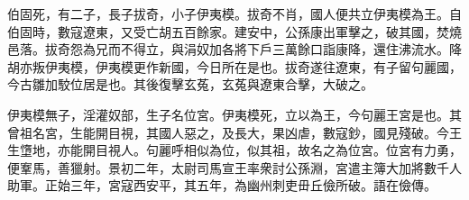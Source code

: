 \begin{pinyinscope}
伯固死，有二子，長子拔奇，小子伊夷模。拔奇不肖，國人便共立伊夷模為王。自伯固時，數寇遼東，又受亡胡五百餘家。建安中，公孫康出軍擊之，破其國，焚燒邑落。拔奇怨為兄而不得立，與涓奴加各將下戶三萬餘口詣康降，還住沸流水。降胡亦叛伊夷模，伊夷模更作新國，今日所在是也。拔奇遂往遼東，有子留句麗國，今古雛加駮位居是也。其後復擊玄菟，玄菟與遼東合擊，大破之。

伊夷模無子，淫灌奴部，生子名位宮。伊夷模死，立以為王，今句麗王宮是也。其曾祖名宮，生能開目視，其國人惡之，及長大，果凶虐，數寇鈔，國見殘破。今王生墯地，亦能開目視人。句麗呼相似為位，似其祖，故名之為位宮。位宮有力勇，便鞌馬，善獵射。景初二年，太尉司馬宣王率衆討公孫淵，宮遣主簿大加將數千人助軍。正始三年，宮寇西安平，其五年，為幽州刺吏毌丘儉所破。語在儉傳。


\end{pinyinscope}